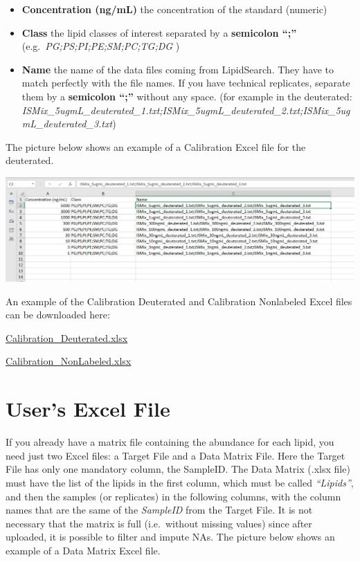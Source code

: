 \documentclass[
]{book}
\providecommand{\tightlist}{%
  \setlength{\itemsep}{0pt}\setlength{\parskip}{0pt}}
\begin{document}
\begin{itemize}
\tightlist
\item
  \textbf{Concentration (ng/mL)} the concentration of the standard (numeric)
\item
  \textbf{Class} the lipid classes of interest separated by a \textbf{semicolon ``;''} (e.g.~\emph{PG;PS;PI;PE;SM;PC;TG;DG} )
\item
  \textbf{Name} the name of the data files coming from LipidSearch. They have to match perfectly with the file names. If you have technical replicates, separate them by a \textbf{semicolon ``;''} without any space. (for example in the deuterated: \emph{ISMix\_5ugmL\_deuterated\_1.txt;ISMix\_5ugmL\_deuterated\_2.txt;ISMix\_5ugmL\_deuterated\_3.txt})
\end{itemize}

The picture below shows an example of a Calibration Excel file for the deuterated.

\includegraphics[width=1\linewidth]{images/calibration_deut_example}

An example of the Calibration Deuterated and Calibration Nonlabeled Excel files can be downloaded here:

\href{https://github.com/ShinyFabio/ADViSELipidomics_book/raw/main/data_example/Calibration_Deuterated.xlsx}{Calibration\_Deuterated.xlsx}

\href{https://github.com/ShinyFabio/ADViSELipidomics_book/raw/main/data_example/Calibration_NonLabeled.xlsx}{Calibration\_NonLabeled.xlsx}

\hypertarget{sec25}{%
\section{User's Excel File}\label{sec25}}

If you already have a matrix file containing the abundance for each lipid, you need just two Excel files: a Target File and a Data Matrix File. Here the Target File has only one mandatory column, the SampleID. The Data Matrix (.xlsx file) must have the list of the lipids in the first column, which must be called \emph{``Lipids''}, and then the samples (or replicates) in the following columns, with the column names that are the same of the \emph{SampleID} from the Target File. It is not necessary that the matrix is full (i.e.~without missing values) since after uploaded, it is possible to filter and impute NAs. The picture below shows an example of a Data Matrix Excel file.
\end{document}
